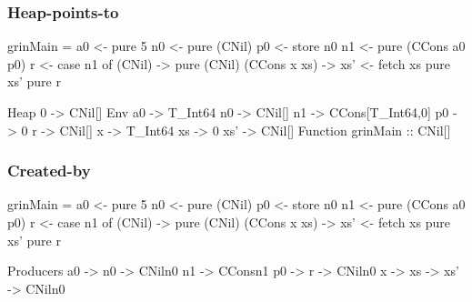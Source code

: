 \documentclass[bigger]{beamer}
\begin{document}
\begin{frame}[fragile]
  \frametitle{Heap-points-to}
  
  \begin{center}
  	\begin{minipage}{0.35\textwidth}
  		\begin{haskellcode}
      grinMain =
        a0 <- pure 5
        n0 <- pure (CNil)
        p0 <- store n0 
        n1 <- pure (CCons a0 p0)
        r  <- case n1 of 
          (CNil) -> 
            pure (CNil)
          (CCons x xs) -> 
            xs' <- fetch xs
            pure xs'
        pure r
  		\end{haskellcode}
  	\end{minipage}
  	\hfill
  	\begin{minipage}{0.48\textwidth}
  		\begin{haskellcode}
  			Heap
  			0 -> {CNil[]}
  			Env
  			a0  -> {T_Int64}
  			n0  -> {CNil[]}
  			n1  -> {CCons[{T_Int64},{0}]}
  			p0  -> {0}
  			r   -> {CNil[]}
  			x   -> {T_Int64}
  			xs  -> {0}
  			xs' -> {CNil[]}
  			Function
  			grinMain :: {CNil[]}
  			
  		\end{haskellcode}
  	\end{minipage}
  \end{center}
  
\end{frame}

\begin{frame}[fragile]
\frametitle{Created-by}

\begin{center}
	\begin{minipage}{0.4\textwidth}
		\begin{haskellcode}
			grinMain =
			  a0 <- pure 5
			  n0 <- pure (CNil)
			  p0 <- store n0 
			  n1 <- pure (CCons a0 p0)
			  r  <- case n1 of 
			    (CNil) -> 
			      pure (CNil)
			    (CCons x xs) -> 
			      xs' <- fetch xs
			      pure xs'
			  pure r
		\end{haskellcode}
	\end{minipage}
	\hfill
	\begin{minipage}{0.40\textwidth}
		\begin{haskellcode}
			Producers
			a0     -> {}
			n0     -> {CNil{n0}}
			n1     -> {CCons{n1}}
			p0     -> {}
			r      -> {CNil{n0}}
			x      -> {}
			xs     -> {}
			xs'    -> {CNil{n0}}
		\end{haskellcode}
	\end{minipage}
\end{center}

\end{frame}
\end{document}
